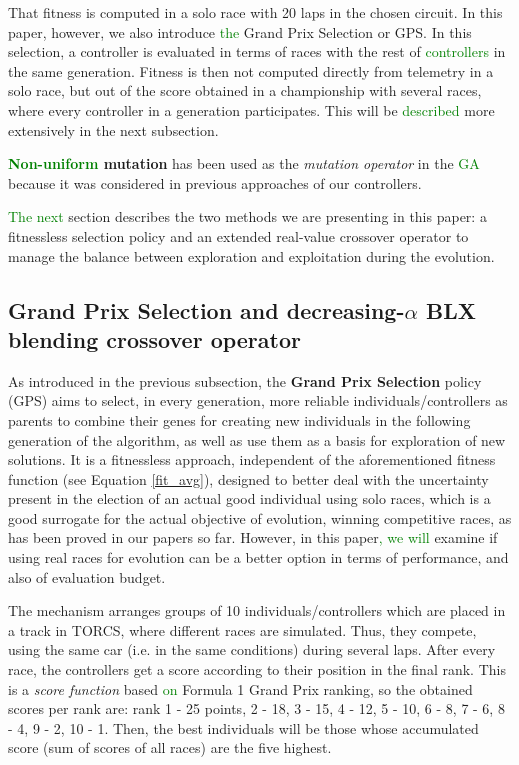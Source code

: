 \documentclass[10pt,journal,compsoc]{IEEEtran}
\begin{document}
That fitness is computed in a solo race with 20 laps in the chosen circuit. In this paper, however, we also introduce \textcolor{green}{the} Grand Prix Selection or GPS. In this
selection, a controller is evaluated in terms of races with the rest
of \textcolor{green}{controllers} in the same generation. Fitness is then not
computed directly from telemetry in a solo race, but out of the score
obtained in a championship with several races, where every controller
in a generation participates. This will be \textcolor{green}{described} more extensively
in the next subsection.

\textbf{\textcolor{green}{Non-uniform} mutation} \cite{mutation1997} has been used as the
\textit{mutation operator} in the \textcolor{green}{GA} because it was considered in
previous approaches of our controllers. 

\textcolor{green}{The next} section describes the two methods we are presenting in
this paper: a fitnessless selection policy and an extended real-value
crossover operator to manage the balance between exploration and
exploitation during the evolution. 

\subsection{Grand Prix Selection and decreasing-$\alpha$ BLX blending crossover operator}
\label{subsec:novel_operators}

As introduced in the previous subsection, the \textbf{Grand Prix Selection} policy (GPS)  aims to select, in every generation, more reliable individuals/controllers as parents to combine their genes for creating new individuals in the following generation of the algorithm, as well as use them as a basis for exploration of new solutions. It is a fitnessless approach,
independent of the aforementioned fitness function (see Equation
\ref{fit_avg}), designed to better deal with the uncertainty present
in the election of an actual good individual using solo races, which
is a good surrogate for the actual objective of evolution, winning
competitive races, as has been proved in our papers so far. However,
in this paper\textcolor{green}{, we will} examine if using real races for evolution can be
a better option in terms of performance, and also of evaluation
budget. 

The mechanism arranges groups of 10 individuals/controllers which are placed in a track in TORCS, where different races are simulated. Thus, they compete, using the same car (i.e. in the same conditions) during several laps. After every race, the controllers get a score according to their position in the final rank. This is a \textit{score function} based \textcolor{green}{on} Formula 1 Grand Prix ranking, so the obtained scores per rank are: rank 1 - 25 points, 2 - 18, 3 - 15, 4 - 12, 5 - 10, 6 - 8, 7 - 6, 8 - 4, 9 - 2, 10 - 1.
Then, the best individuals will be those whose accumulated score (sum of scores of all races) are the five highest.
\end{document}
